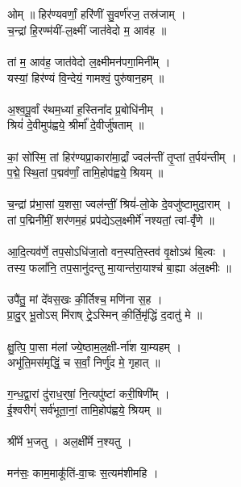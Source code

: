 \section{}
ओम् ॥ हिर॑ण्यवर्णां॒ हरि॑णीं सु॒वर्ण॑रज॒ तस्र॑जाम् ।\\
च॒न्द्रां हि॒रण्म॑यीं-ल॒क्ष्मीं जात॑वेदो म॒ आव॑ह ॥\\
\\
तां म॒ आव॑ह॒ जात॑वेदो ल॒क्ष्मीमन॑पगा॒मिनी᳚म् ।\\
यस्यां॒ हिर॑ण्यं वि॒न्देयं॒ गामश्वं॒ पुरु॑षान॒हम् ॥\\
\\
अ॒श्व॒पू॒र्वां र॑थम॒ध्यां ह॒स्तिना᳚द प्र॒बोधि॑नीम् ।\\
श्रियं॑ दे॒वीमुप॑ह्वये॒ श्रीर्मा᳚  दे॒वीर्जु॑षताम् ॥\\
\\
कां॒ सो॑स्मि॒ तां हिर॑ण्यप्रा॒कारा॑मा॒र्द्रां ज्वल॑न्तीं तृ॒प्तां त॒र्पय॑न्तीम् ।\\
प॒द्मे॒ स्थि॒तां प॒द्मव॑र्णां॒ तामि॒होप॑ह्वये॒ श्रियम् ॥\\
\\
च॒न्द्रां प्र॑भा॒सां य॒शसा॒ ज्वल॑न्तीं॒ श्रियं॑-लो॒के दे॒वजु॑ष्टामुदा॒राम् ।\\
तां प॒द्मिनी॑मीं॒ शर॑णम॒हं प्रप॑द्येऽल॒क्ष्मीर्मे॑ नश्यतां॒ त्वां-वृँ॑णे ॥\\
\\
आ॒दि॒त्यव॑र्णे॒ तप॒सोऽधि॑जा॒तो वन॒स्पति॒स्तव॑ वृ॒क्षोऽथ॑ बि॒ल्वः ।\\
तस्य॒ फला᳚नि॒ तप॒सानु॑दन्तु मा॒यान्त॑रा॒याश्च॑ बा॒ह्या अ॑ल॒क्ष्मीः ॥\\
\\
उपै॑तु॒ मां दे᳚वस॒खः की॒र्तिश्च॒ मणि॑ना स॒ह ।\\
प्रा॒दु॒र् भू॒तोऽस् मि॑राष् ट्रे॒ऽस्मिन् की॒र्ति॒मृ॑द्धिं द॒दातु॑ मे ॥\\
\\
क्षु॒त्पि॒ पा॒सा म॑लां ज्ये॒ष्ठाम॒ल॒क्षी-र्ना॑श या॒म्यहम् ।\\
अभू॑ति॒मस॑मृद्धिं॒ च स॒र्वां॒ निर्णु॑द मे॒ गृहात् ॥\\
\\
ग॒न्ध॒द्वा॒रां दु॑राध॒र्​षां॒ नि॒त्यपु॑ष्टां करी॒षिणी᳚म् ।\\
ई॒श्वरीग्ं॑ सर्व॑भूता॒नां॒ तामि॒होप॑ह्वये॒ श्रियम् ॥\\
\\
श्री᳚र्मे भ॒जतु । अल॒क्षी᳚र्मे न॒श्यतु ।\\
\\
मन॑सः॒ काम॒माकू᳚तिं-वा॒चः स॒त्यम॑शीमहि ।\\
